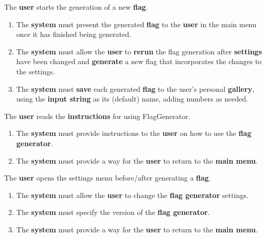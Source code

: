 \documentclass[12pt, titlepage]{article}
\begin{document}
\begin{enumerate}[label=BE\arabic*.]
    \begin{item}
        The \textbf{user} starts the generation of a new \textbf{flag}.
        \begin{enumerate}[label=FR\arabic*., resume*=frs]
            \item The \textbf{system} must present the generated \textbf{flag} to the \textbf{user} in the main menu once it has finished being generated.

            \item The \textbf{system} must allow the \textbf{user} to \textbf{rerun} the flag generation after \textbf{settings} have been changed and \textbf{generate} a new flag that incorporates the changes to the settings.

            \item The \textbf{system} must \textbf{save} each generated \textbf{flag} to the user’s personal \textbf{gallery}, using the \textbf{input string} as its (default) name, adding numbers as needed.
        \end{enumerate}
    \end{item}

    \begin{item}
        The \textbf{user} reads the \textbf{instructions} for using FlagGenerator.
        \begin{enumerate}[label=FR\arabic*., resume*=frs]
            \item The \textbf{system} must provide instructions to the \textbf{user} on how to use the \textbf{flag generator}.

            \item The \textbf{system} must provide a way for the \textbf{user} to return to the \textbf{main menu}.
        \end{enumerate}
    \end{item}

    \begin{item}
        The \textbf{user} opens the settings menu before/after generating a \textbf{flag}.
        \begin{enumerate}[label=FR\arabic*., resume*=frs]
            \item The \textbf{system} must allow the \textbf{user} to change the \textbf{flag generator} settings.

            \item The \textbf{system} must specify the version of the \textbf{flag generator}.

            \item The \textbf{system} must provide a way for the \textbf{user} to return to the \textbf{main menu}.
        \end{enumerate}
    \end{item}


\end{enumerate}
\end{document}
